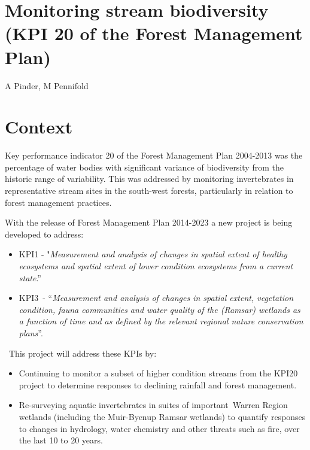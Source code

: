 \documentclass[version=last,
    paper=a4, %
    10pt, %
    usenames,
    dvipsnames,
    oneside, %
    headings=openany, %
    DIV=15 %
]{scrbook}
\begin{document}
\section*{Monitoring stream biodiversity (KPI 20 of the Forest Management Plan)
}

A Pinder, M Pennifold



\section*{Context}

Key performance indicator 20 of the Forest Management Plan 2004-2013 was
the percentage of water bodies with significant variance of biodiversity
from the historic range of variability. This was addressed by monitoring
invertebrates in representative stream sites in the south-west forests,
particularly in relation to forest management practices.

With the release of Forest Management Plan 2014-2023 a new project is
being developed to address:

\begin{itemize}
\itemsep1pt\parskip0pt
\item
  KPI1 - "\emph{Measurement and analysis of changes in spatial extent of
  healthy ecosystems and spatial extent of lower condition ecosystems
  from a current state}.''
\item
  KPI3~- ``\emph{Measurement and analysis of changes in spatial extent,
  vegetation condition, fauna communities and water quality of the
  (Ramsar) wetlands as a function of time and as defined by the relevant
  regional nature conservation plans}''.
\end{itemize}

~This project will address these KPIs by:

\begin{itemize}
\item
  Continuing to monitor a subset of higher condition streams from the
  KPI20 project to determine responses to declining rainfall and forest
  management.
\item
  Re-surveying aquatic invertebrates in suites of important~Warren
  Region wetlands (including the Muir-Byenup Ramsar wetlands) to
  quantify responses to changes in hydrology, water chemistry and other
  threats such as fire, over the last 10 to 20 years.
\end{itemize}
\end{document}
